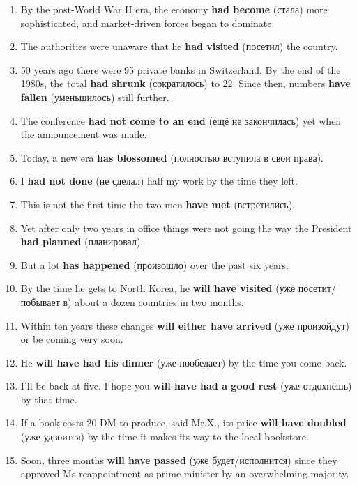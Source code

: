 \documentclass[main.tex]{subfiles}
\begin{document}

\begin{enumerate}[nosep,leftmargin=*]
	\item By the post-World War II era, the economy \textbf{had become} (стала) more sophisticated, and market-driven forces began to dominate.
	\item The authorities were unaware that he \textbf{had visited} (посетил) the country.
	\item 50 years ago there were 95 private banks in Switzerland. By the end of the 1980s, the total \textbf{had shrunk} (сократилось) to 22. Since then, numbers \textbf{have fallen} (уменьшилось) still further.
	\item The conference \textbf{had not come to an end} (ещё не закончилась) yet when the announcement was made.
	\item Today, a new era \textbf{has blossomed} (полностью вступила в свои права).
	\item I \textbf{had not done} (не сделал) half my work by the time they left.
	\item This is not the first time the two men \textbf{have met} (встретились).
	\item Yet after only two years in office things were not going the way the President \textbf{had planned} (планировал).
	\item But a lot \textbf{has happened} (произошло) over the past six years.
	\item By the time he gets to North Korea, he \textbf{will have visited} (уже посетит/побывает в) about a dozen countries in two months.
	\item Within ten years these changes \textbf{will either have arrived} (уже произойдут) or be coming very soon.
	\item He \textbf{will have had his dinner} (уже пообедает) by the time you come back.
	\item I'll be back at five. I hope you \textbf{will have had a good rest} (уже отдохнёшь) by that time.
	\item If a book costs 20 DM to produce, said Mr.X., its price \textbf{will have doubled} (уже удвоится) by the time it makes its way to the local bookstore.
	\item Soon, three months \textbf{will have passed} (уже будет/исполнится) since they approved Ms reappointment as prime minister by an overwhelming majority.
\end{enumerate}
\ 
\end{document}
